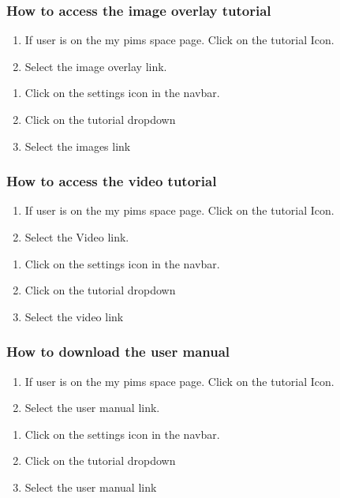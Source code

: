 \documentclass[14pt, a4paper]{article}
\begin{document}
\subsubsection{How to access the image overlay tutorial}
\begin{enumerate}
\item If user is on the my pims space page. Click on the tutorial Icon.
\item Select the image overlay link.
\end{enumerate}
\begin{enumerate}
\item Click on the settings icon in the navbar.
\item Click on the tutorial dropdown
\item Select the images link
\end{enumerate}
\subsubsection{How to access the video tutorial}
\begin{enumerate}
\item If user is on the my pims space page. Click on the tutorial Icon.
\item Select the Video link.
\end{enumerate}
\begin{enumerate}
\item Click on the settings icon in the navbar.
\item Click on the tutorial dropdown
\item Select the video link
\end{enumerate}
\subsubsection{How to download the user manual}
\begin{enumerate}
\item If user is on the my pims space page. Click on the tutorial Icon.
\item Select the user manual link.
\end{enumerate}
\begin{enumerate}
\item Click on the settings icon in the navbar.
\item Click on the tutorial dropdown
\item Select the user manual link
\end{enumerate}
\newpage
\end{document}
